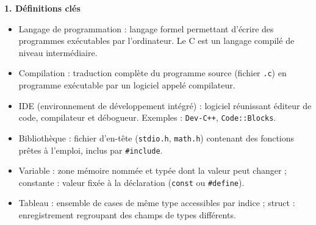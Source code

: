 \documentclass[11pt]{article}
\newcommand{\cle}[1]{{\popxbold\color{popdark}#1}}
\begin{document}
\begin{aretenir}
\textbf{1. Définitions clés}
\begin{itemize}
  \item \cle{Langage de programmation} : langage formel permettant d'écrire des programmes exécutables par l'ordinateur. Le \cle{C} est un langage compilé de niveau intermédiaire.
  \item \cle{Compilation} : traduction complète du programme source (fichier \texttt{.c}) en programme exécutable par un logiciel appelé \cle{compilateur}.
  \item \cle{IDE} (environnement de développement intégré) : logiciel réunissant éditeur de code, compilateur et débogueur. Exemples : \texttt{Dev-C++}, \texttt{Code::Blocks}.
  \item \cle{Bibliothèque} : fichier d'en-tête (\texttt{stdio.h}, \texttt{math.h}) contenant des fonctions prêtes à l'emploi, inclus par \texttt{\#include}.
  \item \cle{Variable} : zone mémoire nommée et typée dont la valeur peut changer ; \cle{constante} : valeur fixée à la déclaration (\texttt{const} ou \texttt{\#define}).
  \item \cle{Tableau} : ensemble de cases de même type accessibles par indice ; \cle{struct} : enregistrement regroupant des champs de types différents.
\end{itemize}
\end{aretenir}
\end{document}
